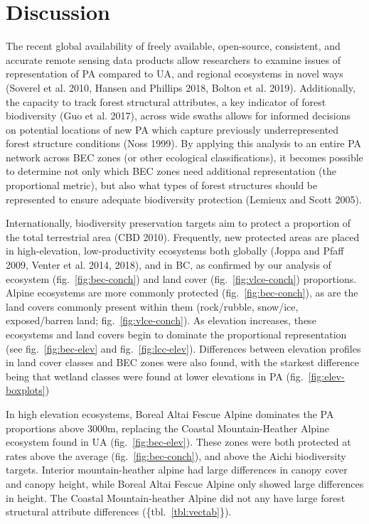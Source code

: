 \documentclass[11pt]{article}
\begin{document}
\hypertarget{discussion}{%
\section{Discussion}\label{discussion}}

The recent global availability of freely available, open-source,
consistent, and accurate remote sensing data products allow researchers
to examine issues of representation of PA compared to UA, and regional
ecosystems in novel ways (Soverel et al. 2010, Hansen and Phillips 2018,
Bolton et al. 2019). Additionally, the capacity to track forest
structural attributes, a key indicator of forest biodiversity (Guo et
al. 2017), across wide swaths allows for informed decisions on potential
locations of new PA which capture previously underrepresented forest
structure conditions (Noss 1999). By applying this analysis to an entire
PA network across BEC zones (or other ecological classifications), it
becomes possible to determine not only which BEC zones need additional
representation (the proportional metric), but also what types of forest
structures should be represented to ensure adequate biodiversity
protection (Lemieux and Scott 2005).

Internationally, biodiversity preservation targets aim to protect a
proportion of the total terrestrial area (CBD 2010). Frequently, new
protected areas are placed in high-elevation, low-productivity
ecosystems both globally (Joppa and Pfaff 2009, Venter et al. 2014,
2018), and in BC, as confirmed by our analysis of ecosystem
(fig.~\ref{fig:bec-conch}) and land cover (fig.~\ref{fig:vlce-conch})
proportions. Alpine ecosystems are more commonly protected
(fig.~\ref{fig:bec-conch}), as are the land covers commonly present
within them (rock/rubble, snow/ice, exposed/barren land;
fig.~\ref{fig:vlce-conch}). As elevation increases, these ecosystems and
land covers begin to dominate the proportional representation (see
fig.~\ref{fig:bec-elev} and fig.~\ref{fig:lcc-elev}). Differences
between elevation profiles in land cover classes and BEC zones were also
found, with the starkest difference being that wetland classes were
found at lower elevations in PA (fig.~\ref{fig:elev-boxplots})

In high elevation ecosystems, Boreal Altai Fescue Alpine dominates the
PA proportions above 3000m, replacing the Coastal Mountain-Heather
Alpine ecosystem found in UA (fig.~\ref{fig:bec-elev}). These zones were
both protected at rates above the average (fig.~\ref{fig:bec-conch}),
and above the Aichi biodiversity targets. Interior mountain-heather
alpine had large differences in canopy cover and canopy height, while
Boreal Altai Fescue Alpine only showed large differences in height. The
Coastal Mountain-heather Alpine did not any have large forest structural
attribute differences (\{tbl.~\ref{tbl:vectab}\}).
\end{document}
